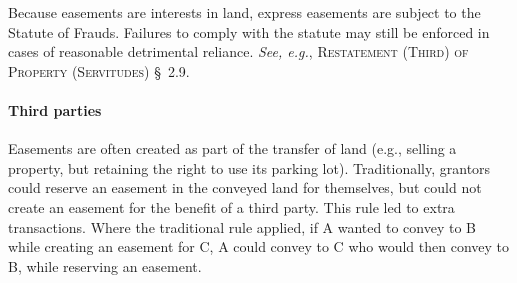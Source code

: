 Because easements are interests in land, express easements are subject to the
Statute of Frauds. Failures to comply with the statute may still be enforced in
cases of reasonable detrimental reliance. \textit{See, e.g.},
\textsc{Restatement (Third) of Property (Servitudes)} \S~2.9. 

\paragraph{Third parties}
Easements are often created as part of the transfer of land (e.g., selling a
property, but retaining the right to use its parking lot). Traditionally,
grantors could reserve an easement in the conveyed land for themselves, but
could not create an easement for the benefit of a third party. This rule led to
extra transactions. Where the traditional rule applied, if A wanted to convey to
B while creating an easement for C, A could convey to C who would then convey to
B, while reserving an easement. 

